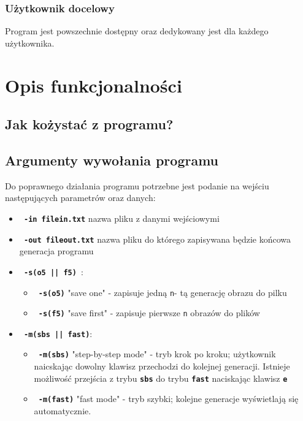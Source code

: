\documentclass[a4paper]{article}
\begin{document}
\subsubsection{U\.zytkownik docelowy}
\quad Program jest powszechnie dost\k{e}pny oraz dedykowany jest dla ka\.zdego u\.zytkownika.




\section{Opis funkcjonalno\'sci}
\subsection{Jak ko\.zysta\'c z programu?}
\subsection{Argumenty wywo\l{}ania programu}
Do poprawnego dzia\l{}ania programu potrzebne jest podanie na wej\'sciu nast\k{e}puj\k{a}cych parametr\'ow oraz danych:
\begin{itemize}
	\item \textbf{\texttt{ -in filein.txt}} nazwa pliku z danymi wej\'sciowymi
	\item \textbf{\texttt{ -out fileout.txt}} nazwa pliku do kt\'orego zapisywana b\k{e}dzie ko\'ncowa generacja programu
	\item \textbf{\texttt{ -s(o5 || f5) }}:
		\begin{itemize}
			\item \textbf{\texttt{ -s(o5)}} "save one" - zapisuje jedn\k{a} \texttt{n}- t\k{a} generacj\k{e} obrazu do pilku 
			\item \textbf{\texttt{ -s(f5)}} "save first" - zapisuje pierwsze \texttt{n} obraz\'ow do plik\'ow
		\end{itemize}
	\item \textbf{\texttt{ -m(sbs || fast)}}:
		\begin{itemize}
			\item \textbf{\texttt{ -m(sbs)}} "step-by-step mode" - tryb krok po kroku; u\.zytkownik naicskaj\k{a}c dowolny klawisz przechodzi do kolejnej generacji. Istnieje mo\.zliwo\'s\'c przej\'scia z trybu \texttt{\textbf{sbs}} do trybu \texttt{\textbf{fast}} naciskaj\k{a}c klawisz \texttt{\textbf{e}}
			\item \textbf{\texttt{ -m(fast)}} "fast mode" - tryb szybki; kolejne generacje wy\'swietlaj\k{a} si\k{e} automatycznie.
		\end{itemize}

\end{itemize}
\end{document}
